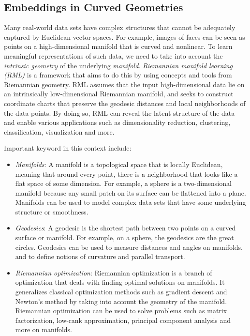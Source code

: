 \documentclass[11pt, a4paper]{amsart}
\begin{document}
\subsection{Embeddings in Curved Geometries}

Many real-world data sets have complex structures that cannot be adequately captured by Euclidean vector spaces.
For example, images of faces can be seen as points on a high-dimensional manifold that is curved and nonlinear.
To learn meaningful representations of such data, we need to take into account the \emph{intrinsic geometry} of the underlying \emph{manifold}.
\emph{Riemannian manifold learning (RML)} is a framework that aims to do this by using concepts and tools from Riemannian geometry.
RML assumes that the input high-dimensional data lie on an intrinsically low-dimensional Riemannian manifold, and seeks to construct coordinate charts that preserve the geodesic distances and local neighborhoods of the data points. 
By doing so, RML can reveal the latent structure of the data and enable various applications such as dimensionality reduction, clustering, classification, visualization and more.

Important keyword in this context include:
\begin{itemize}
	\item \emph{Manifolds}:
	A manifold is a topological space that is locally Euclidean, meaning that around every point, there is a neighborhood that looks like a flat space of some dimension.
	For example, a sphere is a two-dimensional manifold because any small patch on its surface can be flattened into a plane.
	Manifolds can be used to model complex data sets that have some underlying structure or smoothness. 
	\item \emph{Geodesics}:
	A geodesic is the shortest path between two points on a curved surface or manifold.
	For example, on a sphere, the geodesics are the great circles.
	Geodesics can be used to measure distances and angles on manifolds, and to define notions of curvature and parallel transport.
	\item \emph{Riemannian optimization}:
	Riemannian optimization is a branch of optimization that deals with finding optimal solutions on manifolds.
	It generalizes classical optimization methods such as gradient descent and Newton’s method by taking into account the geometry of the manifold.
	Riemannian optimization can be used to solve problems such as matrix factorization, low-rank approximation, principal component analysis and more on manifolds.
\end{itemize}
\end{document}
